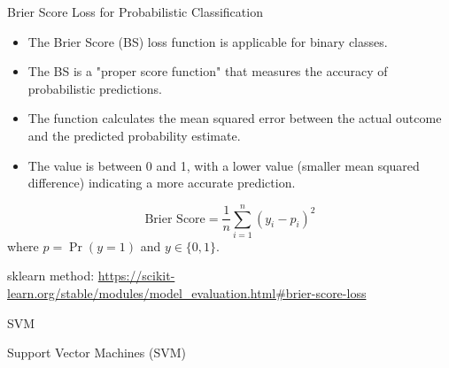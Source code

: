 \documentclass[11pt]{beamer}
\begin{document}
\begin{frame}{Brier Score Loss for Probabilistic Classification}
    \small
    \begin{itemize}
        \item The Brier Score (BS) loss function is applicable for binary classes.
        \item The BS is a "proper score function" that measures the accuracy of probabilistic predictions.
        \item The function calculates the mean squared error between the actual outcome and the predicted probability estimate.
        \item The value is between 0 and 1, with a lower value (smaller mean squared difference) indicating a more accurate prediction.
    \end{itemize}
    \begin{equation}
        \text{Brier Score} = \frac{1}{n} \sum_{i=1}^{n} (y_i - p_i)^2
    \end{equation}
    where $p=\Pr(y=1)$ and $y \in \{0,1\}$.
    \medskip

    \small{sklearn method: \url{https://scikit-learn.org/stable/modules/model_evaluation.html\#brier-score-loss}}
\end{frame}


\begin{frame}{SVM}
	\begin{center}
		\LARGE
		Support Vector Machines (SVM)
	\end{center}
\end{frame}
\end{document}
